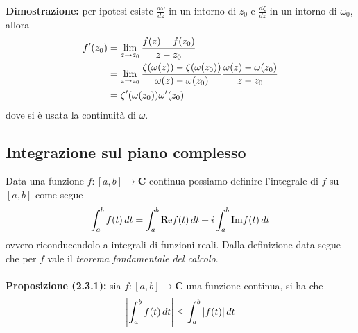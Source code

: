 \documentclass{article}
\begin{document}
\textbf{Dimostrazione:} per ipotesi esiste $\frac{d\omega}{dz}$ in un intorno di $z_0$ e $\frac{d\zeta}{dz}$ in un intorno di $\omega_0$, allora
\begin{align}
    f'(z_0) &= \lim_{z \rightarrow z_0}\frac{f(z) - f(z_0)}{z - z_0} \notag \\
    &= \lim_{z \rightarrow z_0}\frac{\zeta(\omega(z)) - \zeta(\omega(z_0))}{\omega(z) - \omega (z_0)}\frac{\omega(z) - \omega(z_0)}{z - z_0} \notag \\
    &= \zeta'(\omega(z_0))\omega'(z_0) \notag
\end{align}
dove si è usata la continuità di $\omega$.

\newpage
\subsection{Integrazione sul piano complesso}
Data una funzione $f : [a, b] \longrightarrow \mathbf{C}$ continua possiamo definire l'integrale di $f$ su $[a, b]$ come segue
\begin{gather}
    \int_a^b f(t) \, dt = \int_a^b \mathrm{Re}f(t) \, dt + i\int_a^b \mathrm{Im}f(t) \, dt \notag
\end{gather}
ovvero riconducendolo a integrali di funzioni reali. Dalla definizione data segue che per $f$ vale il \textit{teorema fondamentale del calcolo}. \\ \\
\textbf{Proposizione (2.3.1):} sia $f : [a, b] \longrightarrow \mathbf{C}$ una funzione continua, si ha che
\begin{gather}
    \left|\int_a^b f(t) \, dt\right| \leq \int_a^b |f(t)| \, dt \notag
\end{gather}
\end{document}

